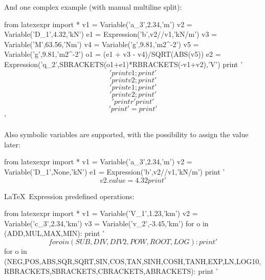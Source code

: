 \documentclass{report}
\begin{document}
And one complex example (with manual multiline split):
\begin{python}
	from latexexpr import *
	v1 = Variable('a_3',2.34,'m')
	v2 = Variable('D_1',4.32,'kN')
	e1 = Expression('b',v2//v1,'kN/m')
	v3 = Variable('M',63.56,'Nm')
	v4 = Variable('g',9.81,'m2^{-2}')
	v5 = Variable('g',9.81,'m2^{-2}')
	o1 = (e1 + v3 - v4)/SQRT(ABS(v5))
	e2 = Expression('q_2',SBRACKETS(o1+e1)*RBRACKETS(-v1+v2),'V')
	print '$$'
	print v1; print '$$\n$$'
	print v2; print '$$\n$$'
	print e1; print '$$\n$$'
	print e2; print '$$\n$$'
	print r'%
	print '$$\n$$'
	print '= %
	print '$$'
\end{python}

Also symbolic variables are supported,
with the possibility to assign the value later:
\begin{python}
	from latexexpr import *
	v1 = Variable('a_3',2.34,'m')
	v2 = Variable('D_1',None,'kN')
	e1 = Expression('b',v2//v1,'kN/m')
	print '$$ %
	v2.value = 4.32
	print '$$ %
\end{python}


\LaTeX\ Expression predefined operations:
\begin{python}
	from latexexpr import *
	v1 = Variable('V_1',1.23,'km')
	v2 = Variable('c_3',2.34,'km')
	v3 = Variable('v_2',-3.45,'km')
	for o in (ADD,MUL,MAX,MIN):
	   print '$$ %
	for o in (SUB,DIV,DIV2,POW,ROOT,LOG):
	   print '$$ %
	for o in (NEG,POS,ABS,SQR,SQRT,SIN,COS,TAN,SINH,COSH,TANH,EXP,LN,LOG10,RBRACKETS,SBRACKETS,CBRACKETS,ABRACKETS):
	   print '$$ %
\end{python}
\end{document}
